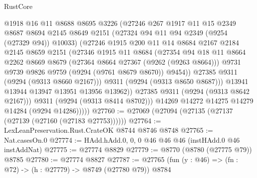 \begin{lexlean}{RustCore}
\begin{coremodule}
                    @1918
                    @16
                    @11
                    @8688
                    @8695
                    @3226
                    (@27246
                      @267
                      @1917
                      @11
                      @15
                      @2349
                      @8687
                      @8694
                      @2145
                      @8649
                      @2151
                      (@27324 @94 @11 @94 @2349 (@9254 (@27329 @94)) @10033)
                      (@27246
                        @1915
                        @200
                        @11
                        @14
                        @8684
                        @2167
                        @2184
                        @2145
                        @8659
                        @2151
                        (@27346
                          @1915
                          @11
                          @8684
                          (@27354
                            @94
                            @18
                            @11
                            @8664
                            @2262
                            @8669
                            @8679
                            (@27364 @8664 @27367 (@9262 (@9263 @8664)))
                            @9731
                            @9739
                            @9826
                            @9759
                            (@9294 (@9761 @8679 @8670))
                            @9454))
                        @27385
                        @9311
                        (@9294 (@9313 @8660 @2167)))
                      @9311
                      (@9294 (@9313 @8650 @8687)))
                    @13941
                    @13944
                    @13947
                    @13951
                    @13956
                    @13962))
                @27385
                @9311
                (@9294 (@9313 @8642 @2167)))
              @9311
              (@9294 (@9313 @8414 @8702)))
            @14269
            @14272
            @14275
            @14279
            @14284
            (@9294 @14286)))))
@27760 := @27069 (@27094 (@27135 (@27137 (@27139 (@27160 (@27183 @27753))))))
@27764 := LexLeanPreservation.Rust.CrateOK @8744 @8746 @8748
@27765 := Nat.casesOn.{0}
@27774 := HAdd.hAdd.{0, 0, 0} @46 @46 @46 (instHAdd.{0} @46 instAddNat)
@27775 := @27774 @8829
@27779 := @8770 (@8780 (@27775 @79)) @8785
@27780 := @27774 @8827
@27787 := @27765 (fun (y : @46) => (fn : @72) -> (h : @27779) -> @8749 (@27780 @79)) @8784

\end{coremodule}
\end{lexlean}
